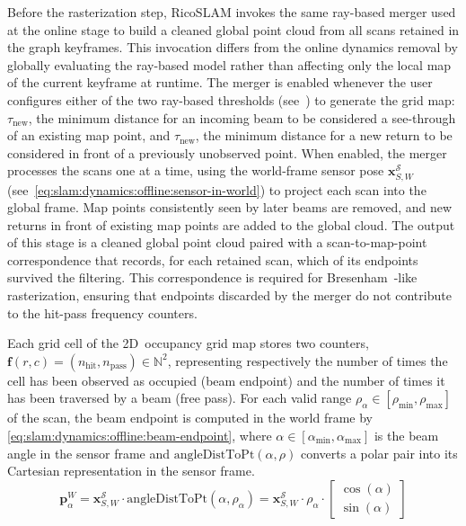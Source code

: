 Before the rasterization step, RicoSLAM invokes the same ray-based merger used
at the online stage to build a cleaned global point cloud from all scans
retained in the graph keyframes. This invocation differs from
the online dynamics removal by globally evaluating the ray-based model
rather than affecting only the local map of the current keyframe at runtime.
The merger is enabled whenever the user configures either of the two ray-based
thresholds (see~) to generate the grid map:
$\tau_{\mathrm{new}}$, the minimum distance
for an incoming beam to be considered a see-through of an existing map point,
and $\tau_{\mathrm{new}}$, the minimum distance for a new return to be
considered in front of a previously unobserved point.
When enabled, the merger processes the scans one at a time, using
the world-frame sensor pose $\mathbf{x}_{S,W}^{\mathcal{S}}$
(see~\eqref{eq:slam:dynamics:offline:sensor-in-world}) to project each scan
into the global frame. Map points consistently seen by later beams are removed,
and new returns in front of existing map points are added to the global cloud.
The output of this stage is a cleaned global point cloud paired with a
scan-to-map-point correspondence that records, for each retained scan, which of
its endpoints survived the filtering. This correspondence is required for
Bresenham~\cite{bresenham:ibm:1965,zingl:uas:2016}-like rasterization, ensuring
that endpoints discarded by the merger do not contribute to
the hit-pass frequency counters.

Each grid cell of the 2D~occupancy grid map stores two counters,
$\mathbf{f}(r,c) = (n_{\mathrm{hit}}, n_{\mathrm{pass}}) \in \mathbb{N}^2$,
representing respectively the number of times the cell has been
observed as occupied (beam endpoint) and the number of times it has
been traversed by a beam (free pass). For each valid range
$\rho_\alpha\in[\rho_{\min},\rho_{\max}]$ of the scan, the beam
endpoint is computed in the world frame by
\eqref{eq:slam:dynamics:offline:beam-endpoint}, where
$\alpha\in[\alpha_{\min},\alpha_{\max}]$ is the beam angle in the
sensor frame and $\mathrm{angleDistToPt}(\alpha,\rho)$ converts a
polar pair into its Cartesian representation in the sensor frame.
\begin{equation}
\label{eq:slam:dynamics:offline:beam-endpoint}
\mathbf{p}_\alpha^{W} =
\mathbf{x}_{S,W}^{\mathcal{S}}\cdot
\mathrm{angleDistToPt}(\alpha,\rho_\alpha) =
\mathbf{x}_{S,W}^{\mathcal{S}}\cdot
\rho_\alpha\cdot
\begin{bmatrix}
\cos(\alpha)\\
\sin(\alpha)
\end{bmatrix}
\end{equation}

